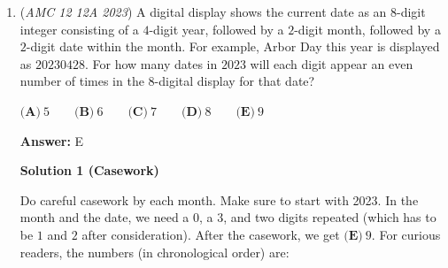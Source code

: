 \begin{enumerate}
Similar to above, but solve for $x = 2^y$ in terms of $y$:

 $(2^{y}+2^{2+(2-y)})/2= 6$
$2^y + 2^{4-y} = 12$
$(2^y)^2 + 2^4 = 12(2^y)$
$x^2 -12x + 16 = 0$

 Distance between roots of the quadratic is the discriminant: $\sqrt{{12}^2 - 4(1)(16)} = \sqrt{80} = \boxed{\textbf{(D) }4\sqrt{5}}$




\textbf{Solution 5 (Similar to Solution 3)}

Let the two points on the curve $y = \log_2 x$ be $A(x_1, \log_2 x_1)$ and $B(x_2, \log_2 x_2)$. By the midpoint formula, the coordinates of the midpoint are given by:
 \[\left( \frac{x_1 + x_2}{2}, \frac{\log_2 x_1 + \log_2 x_2}{2} \right)\]

 Given that the midpoint is $(6, 2)$, we obtain the following system of equations:\begin{align}x_1 + x_2 &= 12 \\\log_2(x_1 x_2) &= 4 \implies x_1 x_2 = 16\end{align}

 By Vieta's formulas, $x_1$ and $x_2$ are the roots of the quadratic equation:
 \[x^2 - 12x + 16 = 0\]

 Solving via the quadratic formula yields the roots:
 \[x = \frac{12 \pm \sqrt{144 - 64}}{2} = 6 \pm 2\sqrt{5}\]

 Without loss of generality, let $x_1 = 6 + 2\sqrt{5}$ and $x_2 = 6 - 2\sqrt{5}$. The horizontal distance between the two points is:
 \[|x_1 - x_2| = (6 + 2\sqrt{5}) - (6 - 2\sqrt{5}) = \boxed{\textbf{(D) } 4\sqrt{5}} \quad \blacksquare\]



	\item (\textit{AMC 12 12A 2023}) A digital display shows the current date as an $8$-digit integer consisting of a $4$-digit year, followed by a $2$-digit month, followed by a $2$-digit date within the month. For example, Arbor Day this year is displayed as $20230428$. For how many dates in $2023$ will each digit appear an even number of times in the 8-digital display for that date?


 $\textbf{(A)}~5\qquad\textbf{(B)}~6\qquad\textbf{(C)}~7\qquad\textbf{(D)}~8\qquad\textbf{(E)}~9$

 \textbf{Answer: }E



\textbf{Solution 1 (Casework)}

Do careful casework by each month. Make sure to start with 2023. In the month and the date, we need a $0$, a $3$, and two digits repeated (which has to be $1$ and $2$ after consideration). After the casework, we get $\boxed{\textbf{(E)}~9}$. For curious readers, the numbers (in chronological order) are:


\end{enumerate}
